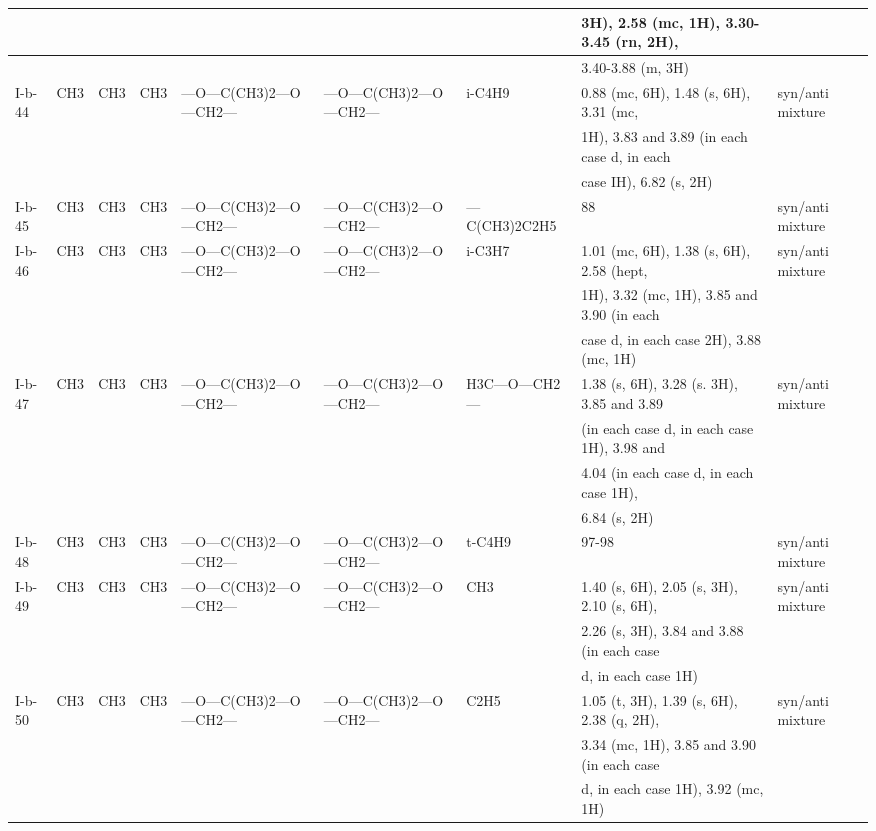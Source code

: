 \documentclass[11pt,a4paper]{article}
\begin{document}
\begin{table}[h]
\begin{tabular}{|l|l|l|l|l|l|l|l|l|}
 &  &  &  &  &  &  & 3H), 2.58 (mc, 1H), 3.30-3.45 (rn, 2H), &  \\ \hline
 &  &  &  &  &  &  & 3.40-3.88 (m, 3H) &  \\ \hline
I-b-44 & CH3 & CH3 & CH3 & —O—C(CH3)2—O—CH2— & —O—C(CH3)2—O—CH2— & i-C4H9 & 0.88 (mc, 6H), 1.48 (s, 6H), 3.31 (mc, & syn/anti mixture \\ \hline
 &  &  &  &  &  &  & 1H), 3.83 and 3.89 (in each case d, in each &  \\ \hline
 &  &  &  &  &  &  & case IH), 6.82 (s, 2H) &  \\ \hline
I-b-45 & CH3 & CH3 & CH3 & —O—C(CH3)2—O—CH2— & —O—C(CH3)2—O—CH2— & —C(CH3)2C2H5 & 88 & syn/anti mixture \\ \hline
I-b-46 & CH3 & CH3 & CH3 & —O—C(CH3)2—O—CH2— & —O—C(CH3)2—O—CH2— & i-C3H7 & 1.01 (mc, 6H), 1.38 (s, 6H), 2.58 (hept, & syn/anti mixture \\ \hline
 &  &  &  &  &  &  & 1H), 3.32 (mc, 1H), 3.85 and 3.90 (in each &  \\ \hline
 &  &  &  &  &  &  & case d, in each case 2H), 3.88 (mc, 1H) &  \\ \hline
I-b-47 & CH3 & CH3 & CH3 & —O—C(CH3)2—O—CH2— & —O—C(CH3)2—O—CH2— & H3C—O—CH2— & 1.38 (s, 6H), 3.28 (s. 3H), 3.85 and 3.89 & syn/anti mixture \\ \hline
 &  &  &  &  &  &  & (in each case d, in each case 1H), 3.98 and &  \\ \hline
 &  &  &  &  &  &  & 4.04 (in each case d, in each case 1H), &  \\ \hline
 &  &  &  &  &  &  & 6.84 (s, 2H) &  \\ \hline
I-b-48 & CH3 & CH3 & CH3 & —O—C(CH3)2—O—CH2— & —O—C(CH3)2—O—CH2— & t-C4H9 & 97-98 & syn/anti mixture \\ \hline
I-b-49 & CH3 & CH3 & CH3 & —O—C(CH3)2—O—CH2— & —O—C(CH3)2—O—CH2— & CH3 & 1.40 (s, 6H), 2.05 (s, 3H), 2.10 (s, 6H), & syn/anti mixture \\ \hline
 &  &  &  &  &  &  & 2.26 (s, 3H), 3.84 and 3.88 (in each case &  \\ \hline
 &  &  &  &  &  &  & d, in each case 1H) &  \\ \hline
I-b-50 & CH3 & CH3 & CH3 & —O—C(CH3)2—O—CH2— & —O—C(CH3)2—O—CH2— & C2H5 & 1.05 (t, 3H), 1.39 (s, 6H), 2.38 (q, 2H), & syn/anti mixture \\ \hline
 &  &  &  &  &  &  & 3.34 (mc, 1H), 3.85 and 3.90 (in each case &  \\ \hline
 &  &  &  &  &  &  & d, in each case 1H), 3.92 (mc, 1H) &  \\ \hline

\end{tabular}
\end{table}
\end{document}
